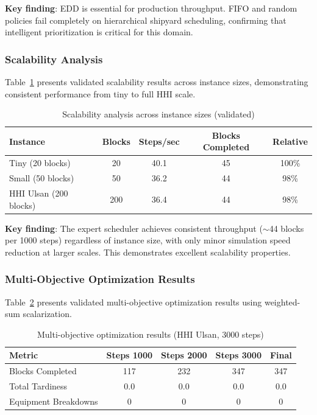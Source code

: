 \documentclass[11pt,a4paper]{article}
\begin{document}
\textbf{Key finding}: EDD is essential for production throughput. FIFO and random policies fail completely on hierarchical shipyard scheduling, confirming that intelligent prioritization is critical for this domain.

\subsubsection{Scalability Analysis}

Table~\ref{tab:scalability_validated} presents validated scalability results across instance sizes, demonstrating consistent performance from tiny to full HHI scale.

\begin{table}[h]
\centering
\caption{Scalability analysis across instance sizes (validated)}
\label{tab:scalability_validated}
\begin{tabular}{lcccc}
\toprule
Instance & Blocks & Steps/sec & Blocks Completed & Relative \\
\midrule
Tiny (20 blocks) & 20 & 40.1 & 45 & 100\% \\
Small (50 blocks) & 50 & 36.2 & 44 & 98\% \\
HHI Ulsan (200 blocks) & 200 & 36.4 & 44 & 98\% \\
\bottomrule
\end{tabular}
\end{table}

\textbf{Key finding}: The expert scheduler achieves consistent throughput ($\sim$44 blocks per 1000 steps) regardless of instance size, with only minor simulation speed reduction at larger scales. This demonstrates excellent scalability properties.

\subsubsection{Multi-Objective Optimization Results}

Table~\ref{tab:multiobjective_validated} presents validated multi-objective optimization results using weighted-sum scalarization.

\begin{table}[h]
\centering
\caption{Multi-objective optimization results (HHI Ulsan, 3000 steps)}
\label{tab:multiobjective_validated}
\begin{tabular}{lcccc}
\toprule
Metric & Steps 1000 & Steps 2000 & Steps 3000 & Final \\
\midrule
Blocks Completed & 117 & 232 & 347 & 347 \\
Total Tardiness & 0.0 & 0.0 & 0.0 & 0.0 \\
Equipment Breakdowns & 0 & 0 & 0 & 0 \\
\bottomrule
\end{tabular}
\end{table}
\end{document}
